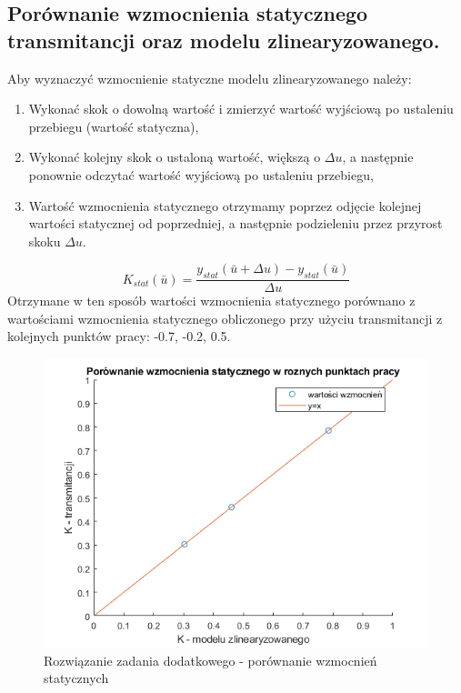 \subsection{Porównanie wzmocnienia statycznego transmitancji oraz modelu zlinearyzowanego.}
Aby wyznaczyć wzmocnienie statyczne modelu zlinearyzowanego należy:
\begin{enumerate}
\item Wykonać skok o dowolną wartość i zmierzyć wartość wyjściową po ustaleniu przebiegu (wartość statyczna),
\item Wykonać kolejny skok o ustaloną wartość, większą o $\Delta u$, a następnie ponownie odczytać wartość wyjściową po ustaleniu przebiegu,
\item Wartość wzmocnienia statycznego otrzymamy poprzez odjęcie kolejnej wartości statycznej od poprzedniej, a następnie podzieleniu przez przyrost skoku $\Delta u$.
\end{enumerate}
\begin{equation}
K_{stat}(\bar{u})=\frac{y_{stat}(\bar{u}+\Delta u) - y_{stat}(\bar{u})}{\Delta u}
\end{equation}
Otrzymane w ten sposób wartości wzmocnienia statycznego porównano z wartościami wzmocnienia statycznego obliczonego przy użyciu transmitancji z kolejnych punktów pracy: -0.7, -0.2, 0.5.
\begin{figure}[H]
\centering
\includegraphics[width=15cm]{images/15.png}
\caption{Rozwiązanie zadania dodatkowego - porównanie wzmocnień statycznych}
\label{fig:15}
\end{figure}
